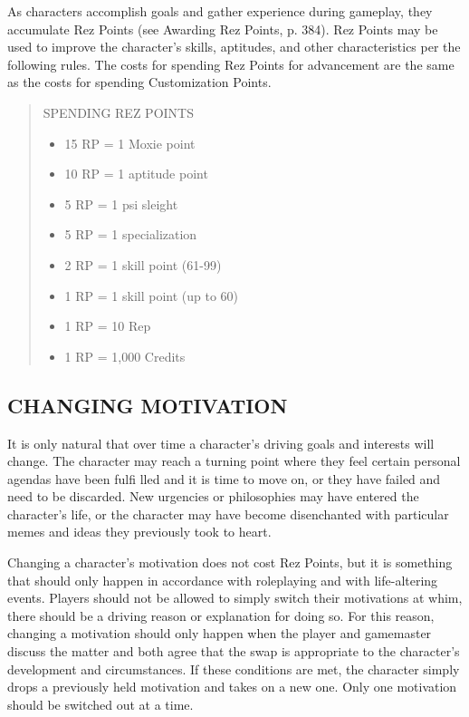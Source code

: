 As characters accomplish goals and gather experience during gameplay, they
accumulate Rez Points (see Awarding Rez Points, p. 384). Rez Points may be used
to improve the character’s skills, aptitudes, and other characteristics per the
following rules. The costs for spending Rez Points for advancement are the same
as the costs for spending Customization Points.

\begin{quotation}
SPENDING REZ POINTS

\begin{itemize}
\item 15 RP = 1 Moxie point
\item 10 RP = 1 aptitude point
\item 5 RP = 1 psi sleight
\item 5 RP = 1 specialization
\item 2 RP = 1 skill point (61-99)
\item 1 RP = 1 skill point (up to 60)
\item 1 RP = 10 Rep
\item 1 RP = 1,000 Credits
\end{itemize}
\end{quotation}

\subsection{CHANGING MOTIVATION}

It is only natural that over time a character’s driving goals and interests
will change. The character may reach a turning point where they feel certain
personal agendas have been fulfi lled and it is time to move on, or they have
failed and need to be discarded. New urgencies or philosophies may have entered
the character’s life, or the character may have become disenchanted with
particular memes and ideas they previously took to heart.

Changing a character’s motivation does not cost Rez Points, but it is something
that should only happen in accordance with roleplaying and with life-altering
events. Players should not be allowed to simply switch their motivations at
whim, there should be a driving reason or explanation for doing so. For this
reason, changing a motivation should only happen when the player and gamemaster
discuss the matter and both agree that the swap is appropriate to the
character’s development and circumstances.  If these conditions are met, the
character simply drops a previously held motivation and takes on a new
one. Only one motivation should be switched out at a time.


